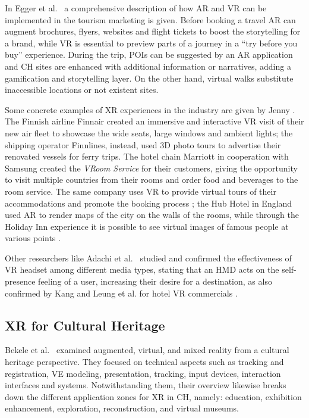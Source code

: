 In Egger et al.~\cite{egger_augmented_2020} a comprehensive description of how AR and VR can be implemented in the tourism marketing is given. Before booking a travel AR can augment brochures, flyers, websites and flight tickets to boost the storytelling for a brand, while VR is essential to preview parts of a journey in a “try before you buy” experience. During the trip, POIs can be suggested by an AR application and CH sites are enhanced with additional information or narratives, adding a gamification and storytelling layer. On the other hand, virtual walks substitute inaccessible locations or not existent sites.

Some concrete examples of XR experiences in the industry are given by Jenny \cite{jenny_enhancing_2017}. The Finnish airline Finnair created an immersive and interactive VR visit of their new air fleet to showcase the wide seats, large windows and ambient lights; the shipping operator Finnlines, instead, used 3D photo tours to advertise their renovated vessels for ferry trips. The hotel chain Marriott in cooperation with Samsung created the \textit{VRoom Service} for their customers, giving the opportunity to visit multiple countries from their rooms and order food and beverages to the room service. The same company uses VR to provide virtual tours of their accommodations and promote the booking process \cite{adachi_using_2020}; the Hub Hotel in England used AR to render maps of the city on the walls of the rooms, while through the Holiday Inn experience it is possible to see virtual images of famous people at various points \cite{ercan_examination_2020}.

Other researchers like Adachi et al.~\cite{adachi_using_2020} studied and confirmed the effectiveness of VR headset among different media types, stating that an \gls{HMD} acts on the self-presence feeling of a user, increasing their desire for a destination, as also confirmed by Kang \cite{kang_impact_2020} and Leung et al. for hotel VR commercials \cite{leung_fad_2020}.

\subsection{XR for Cultural Heritage}
Bekele et al.~\cite{bekele_survey_2018} examined augmented, virtual, and mixed reality from a cultural heritage perspective. They focused on technical aspects such as tracking and registration, VE modeling, presentation, tracking, input devices, interaction interfaces and systems. Notwithstanding them, their overview likewise breaks down the different application zones for XR in CH, namely: education, exhibition enhancement, exploration, reconstruction, and virtual museums.

